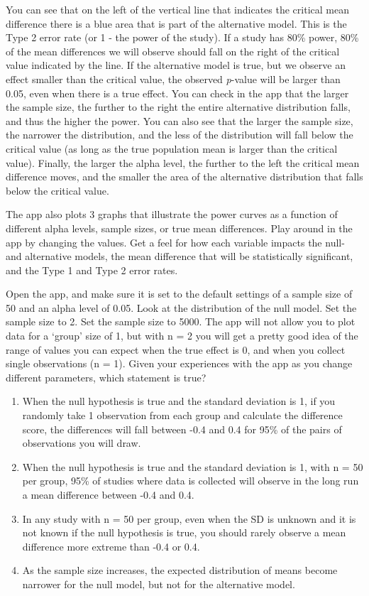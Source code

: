 \documentclass[
]{krantz}
\providecommand{\tightlist}{%
  \setlength{\itemsep}{0pt}\setlength{\parskip}{0pt}}
\begin{document}
You can see that on the left of the vertical line that indicates the critical mean difference there is a blue area that is part of the alternative model. This is the Type 2 error rate (or 1 - the power of the study). If a study has 80\% power, 80\% of the mean differences we will observe should fall on the right of the critical value indicated by the line. If the alternative model is true, but we observe an effect smaller than the critical value, the observed \emph{p}-value will be larger than 0.05, even when there is a true effect. You can check in the app that the larger the sample size, the further to the right the entire alternative distribution falls, and thus the higher the power. You can also see that the larger the sample size, the narrower the distribution, and the less of the distribution will fall below the critical value (as long as the true population mean is larger than the critical value). Finally, the larger the alpha level, the further to the left the critical mean difference moves, and the smaller the area of the alternative distribution that falls below the critical value.

The app also plots 3 graphs that illustrate the power curves as a function of different alpha levels, sample sizes, or true mean differences. Play around in the app by changing the values. Get a feel for how each variable impacts the null- and alternative models, the mean difference that will be statistically significant, and the Type 1 and Type 2 error rates.

Open the app, and make sure it is set to the default settings of a
sample size of 50 and an alpha level of 0.05. Look at the distribution of the null model. Set the sample size to 2. Set the sample size to 5000. The app will not allow you to plot data for a `group' size of 1, but with n = 2 you will get a pretty good idea of the range of values you can expect when the true effect is 0, and when you collect single observations (n = 1). Given your experiences with the app as you change different parameters, which statement is true?

\begin{enumerate}
\def\labelenumi{\Alph{enumi})}
\tightlist
\item
  When the null hypothesis is true and the standard deviation is 1, if you
  randomly take 1 observation from each group and calculate the difference score, the differences will fall between -0.4 and 0.4 for 95\% of the pairs of observations you will draw.
\item
  When the null hypothesis is true and the standard deviation is 1, with n = 50 per group, 95\% of studies where data is collected will observe in the long run a mean difference between -0.4 and 0.4.
\item
  In any study with n = 50 per group, even when the SD is unknown and it is not known if the null hypothesis is true, you should rarely observe a mean difference more extreme than -0.4 or 0.4.
\item
  As the sample size increases, the expected distribution of means become narrower for the null model, but not for the alternative model.
\end{enumerate}
\end{document}
